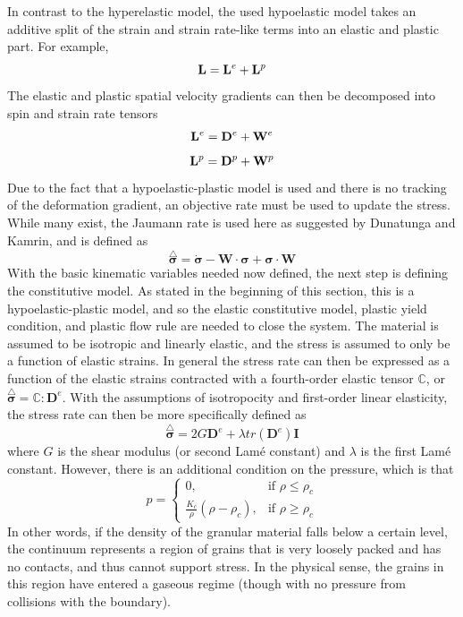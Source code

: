 In contrast to the hyperelastic model, the used hypoelastic model takes an additive split of the strain and strain rate-like terms into an elastic and plastic part. For example,
$$\bold{L}=\bold{L}^e+\bold{L}^p$$
The elastic and plastic spatial velocity gradients can then be decomposed into spin and strain rate tensors
$$\bold{L}^e=\bold{D}^e+\bold{W}^e$$
$$\bold{L}^p=\bold{D}^p+\bold{W}^p$$
Due to the fact that a hypoelastic-plastic  model is used and there is no tracking of the deformation gradient, an objective rate must be used to update the stress. While many exist, the Jaumann rate is used here as suggested by Dunatunga and Kamrin, and is defined as
\begin{equation}
\stackrel{\triangle}{\bm{\sigma}}=\dot{\bm{\sigma}}-\bm{W}\cdot\bm{\sigma}+\bm{\sigma}\cdot\bm{W}\label{Jaumann_rate}
\end{equation}
With the basic kinematic variables needed now defined, the next step is defining the constitutive model. As stated in the beginning of this section, this is a hypoelastic-plastic model, and so the elastic constitutive model, plastic yield condition, and plastic flow rule are needed to close the system. The material is assumed to be isotropic and linearly elastic, and the stress is assumed to only be a function of elastic strains. In general the stress rate can then be expressed as a function of the elastic strains contracted with a fourth-order elastic tensor $\mathbb{C}$, or $\stackrel{\triangle}{\bm{\sigma}}=\mathbb{C}:\bm{D}^e$. With the assumptions of isotropocity and first-order linear elasticity, the stress rate can then be more specifically defined as
\begin{equation}
\stackrel{\triangle}{\bm{\sigma}}=2G\bm{D}^e+\lambda tr(\bm{D}^e)\bm{I}\label{constitutive}
\end{equation}
where $G$ is the shear modulus (or second Lam\'e constant) and $\lambda$ is the first Lam\'e constant. However, there is an additional condition on the pressure, which is that
\begin{equation}
	p=
\begin{cases}
	0,							 & \text{if } \rho \leq \rho_c \\
	\frac{K_c}{\rho}(\rho-\rho_c),& \text{if } \rho \geq \rho_c
\end{cases}
\label{pressure_state}
\end{equation}
In other words, if the density of the granular material falls below a certain level, the continuum represents a region of grains that is very loosely packed and has no contacts, and thus cannot support stress. In the physical sense, the grains in this region have entered a gaseous regime (though with no pressure from collisions with the boundary).

